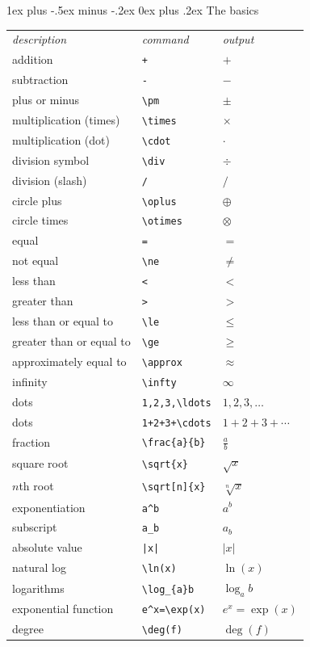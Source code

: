 \documentclass[10pt,UTF8,a4paper]{ctexart}
\makeatletter
\renewcommand{\subsection}{\@startsection{subsection}{2}{0mm}%
                                {1ex plus -.5ex minus -.2ex}%
                                {0ex plus .2ex}%
                                {\normalfont\normalsize\bfseries}}
\makeatother
\begin{document}
\begin{multicols}{3}
\subsection{The basics}
\begin{tabular}{lll}
\emph{description} & \emph{command} & \emph{output}\\
addition & \verb!+! & $+$\\
subtraction & \verb!-! & $-$\\
plus or minus & \verb!\pm! & $\pm$\\
multiplication (times) & \verb!\times! & $\times$\\
multiplication (dot) & \verb!\cdot! & $\cdot$\\
division symbol & \verb!\div! & $\div$\\
division (slash) & \verb!/! & $/$\\
circle plus & \verb!\oplus! & $\oplus$\\
circle times & \verb!\otimes! & $\otimes$\\
equal & \verb!=! & $=$\\
not equal & \verb!\ne! & $\ne$\\
less than & \verb!<! & $<$\\
greater than & \verb!>! & $>$\\
less than or equal to & \verb!\le! & $\le$\\
greater than or equal to & \verb!\ge! & $\ge$\\
approximately equal to & \verb!\approx! & $\approx$\\
infinity & \verb!\infty! & $\infty$\\
dots & \verb!1,2,3,\ldots! & $1,2,3,\ldots$\\
dots & \verb!1+2+3+\cdots! & $1+2+3+\cdots$\\
fraction & \verb!\frac{a}{b}! & $\frac{a}{b}$\\
square root & \verb!\sqrt{x}! & $\sqrt{x}$\\
$n$th root & \verb!\sqrt[n]{x}! & $\sqrt[n]{x}$\\
exponentiation & \verb!a^b! & $a^{b}$\\
subscript & \verb!a_b! & $a_{b}$\\
absolute value & \verb!|x|! & $|x|$\\
natural log  & \verb!\ln(x)! & $\ln(x)$\\
logarithms & \verb!\log_{a}b! & $\log_{a}b$\\
exponential function & \verb!e^x=\exp(x)! & $e^{x}=\exp(x)$\\
degree & \verb!\deg(f)! & $\deg(f)$\\
\end{tabular}


\end{multicols}
\end{document}
